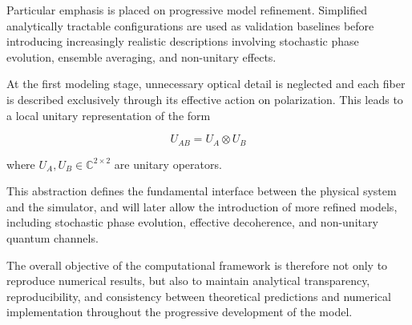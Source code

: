 \medskip

Particular emphasis is placed on progressive model refinement. Simplified analytically tractable configurations are used as validation baselines before introducing increasingly realistic descriptions involving stochastic phase evolution, ensemble averaging, and non-unitary effects.

\medskip

At the first modeling stage, unnecessary optical detail is neglected and each fiber is described exclusively through its effective action on polarization. This leads to a local unitary representation of the form

\begin{equation}
U_{AB} = U_A \otimes U_B
\label{eq:local_unitary_evolution}
\end{equation}

where \( U_A, U_B \in \mathbb{C}^{2 \times 2} \) are unitary operators.

\medskip

This abstraction defines the fundamental interface between the physical system and the simulator, and will later allow the introduction of more refined models, including stochastic phase evolution, effective decoherence, and non-unitary quantum channels.

\medskip

The overall objective of the computational framework is therefore not only to reproduce numerical results, but also to maintain analytical transparency, reproducibility, and consistency between theoretical predictions and numerical implementation throughout the progressive development of the model.